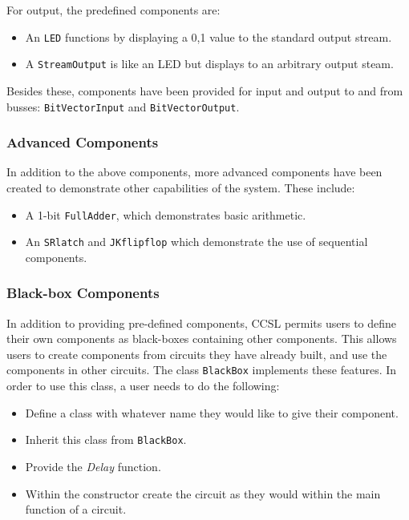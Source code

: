 \documentclass{article}
\newcommand{\ClassName}[1]{\texttt{#1}}
\newcommand{\FunctionName}[1]{\textit{#1}}
\begin{document}
For output, the predefined components are:

\begin{itemize}

\item An \ClassName{LED} functions by displaying a 0,1 value to the standard output stream.

\item A \ClassName{StreamOutput} is like an LED but displays to an arbitrary output steam.

\end{itemize}

Besides these, components have been provided for input and output to and from busses: \ClassName{BitVectorInput} and \ClassName{BitVectorOutput}.

\subsubsection{Advanced Components}

In addition to the above components, more advanced components have been created to demonstrate other capabilities of the system. These include:

\begin{itemize}

\item A 1-bit \ClassName{FullAdder}, which demonstrates basic arithmetic.

\item An \ClassName{SRlatch} and \ClassName{JKflipflop} which demonstrate the use of sequential components.

\end{itemize}

\subsubsection{Black-box Components}

In addition to providing pre-defined components, CCSL permits users to define their own components as black-boxes containing other components. This allows users to create components from circuits they have already built, and use the components in other circuits. The class \ClassName{BlackBox} implements these features. In order to use this class, a user needs to do the following:

\begin{itemize}

\item Define a class with whatever name they would like to give their component.
\item Inherit this class from \ClassName{BlackBox}.
\item Provide the \FunctionName{Delay} function.
\item Within the constructor create the circuit as they would within the main function of a circuit.

\end{itemize}
\end{document}
